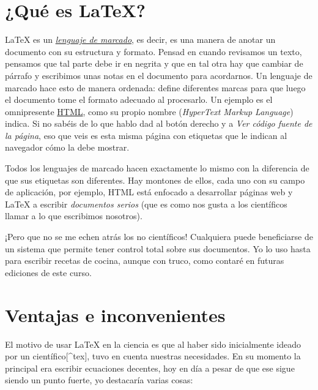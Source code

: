 \section{¿Qué es LaTeX?}\label{que-es-latex}

LaTeX es un
\href{https://es.m.wikipedia.org/wiki/Lenguaje_de_marcado}{\emph{lenguaje
de marcado}}, es decir, es una manera de anotar un documento con su
estructura y formato. Pensad en cuando revisamos un texto, pensamos que
tal parte debe ir en negrita y que en tal otra hay que cambiar de
párrafo y escribimos unas notas en el documento para acordarnos. Un
lenguaje de marcado hace esto de manera ordenada: define diferentes
marcas para que luego el documento tome el formato adecuado al
procesarlo. Un ejemplo es el omnipresente
\href{https://es.m.wikipedia.org/wiki/HTML}{HTML}, como su propio nombre
(\emph{HyperText Markup Language}) indica. Si no sabéis de lo que hablo
dad al botón derecho y a \emph{Ver código fuente de la página}, eso que
veis es esta misma página con etiquetas que le indican al navegador cómo
la debe mostrar.

Todos los lenguajes de marcado hacen exactamente lo mismo con la
diferencia de que sus etiquetas son diferentes. Hay montones de ellos,
cada uno con su campo de aplicación, por ejemplo, HTML está enfocado a
desarrollar páginas web y LaTeX a escribir \emph{documentos serios} (que
es como nos gusta a los científicos llamar a lo que escribimos
nosotros).

¡Pero que no se me echen atrás los no científicos! Cualquiera puede
beneficiarse de un sistema que permite tener control total sobre sus
documentos. Yo lo uso hasta para escribir recetas de cocina, aunque con
truco, como contaré en futuras ediciones de este curso.

\section{Ventajas e inconvenientes}\label{ventajas-e-inconvenientes}

El motivo de usar LaTeX en la ciencia es que al haber sido inicialmente
ideado por un científico{[}\^{}tex{]}, tuvo en cuenta nuestras
necesidades. En su momento la principal era escribir ecuaciones
decentes, hoy en día a pesar de que ese sigue siendo un punto fuerte, yo
destacaría varias cosas:

